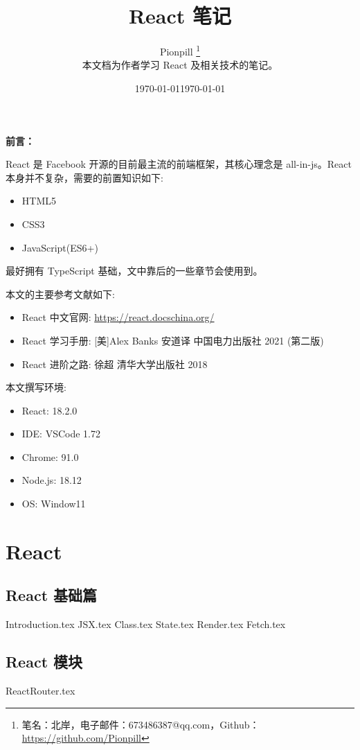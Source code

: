 \documentclass{PionpillNote-book}
\title{React 笔记}
\author{
    Pionpill \footnote{笔名：北岸，电子邮件：673486387@qq.com，Github：\url{https://github.com/Pionpill}} \\
    本文档为作者学习 React 及相关技术的笔记。\\
}
\date{\today}
\begin{document}
\pagestyle{plain}
\maketitle

\noindent\textbf{前言：}

React 是 Facebook 开源的目前最主流的前端框架，其核心理念是 all-in-js。React 本身并不复杂，需要的前置知识如下:
\begin{itemize}
    \item HTML5
    \item CSS3
    \item JavaScript(ES6+)
\end{itemize}

最好拥有 TypeScript 基础，文中靠后的一些章节会使用到。

本文的主要参考文献如下:
\begin{itemize}
    \item React 中文官网: \url{https://react.docschina.org/}
    \item React 学习手册: [美]Alex Banks 安道译 中国电力出版社 2021 (第二版)
    \item React 进阶之路: 徐超 清华大学出版社 2018
\end{itemize}

本文撰写环境:

\begin{itemize}
    \item React: 18.2.0
    \item IDE: VSCode 1.72 
    \item Chrome: 91.0
    \item Node.js: 18.12
    \item OS: Window11
\end{itemize}

\date{\today}
\newpage

\tableofcontents

\newpage

\setcounter{page}{1} 
\pagestyle{fancy}

\part{React}
\chapter{React 基础篇}
{Introduction.tex}
{JSX.tex}
{Class.tex}
{State.tex}
{Render.tex}
{Fetch.tex}
\chapter{React 模块}
{ReactRouter.tex}
\end{document}
